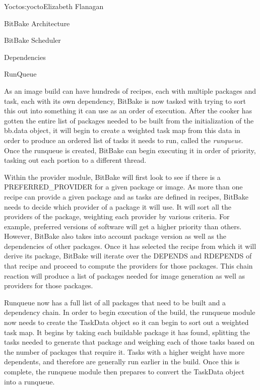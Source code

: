 \begin{aosachapter}{Yocto}{s:yocto}{Elizabeth Flanagan}
\begin{aosasect1}{BitBake Architecture}
\begin{aosasect2}{BitBake Scheduler}
\begin{aosasect3}{Dependencies}
\end{aosasect3}

\begin{aosasect3}{RunQueue}

As an image build can have hundreds of recipes, each with multiple
packages and task, each with its own dependency, BitBake is now
tasked with trying to sort this out into something it can use as an
order of execution. After the cooker has gotten the entire list
of packages needed to be built from the initialization of the bb.data
object, it will begin to create a weighted task map from this data in
order to produce an ordered list of tasks it needs to run, called
the \emph{runqueue}. Once the runqueue is created, BitBake can begin
executing it in order of priority, tasking out each portion to a
different thread.

Within the provider module, BitBake will first look to see if there is
a PREFERRED\_PROVIDER for a given package or image. As more than one
recipe can provide a given package and as tasks are defined in
recipes, BitBake needs to decide which provider of a package it will
use. It will sort all the providers of the package, weighting each
provider by various criteria. For example, preferred versions of
software will get a higher priority than others. However, BitBake also
takes into account package version as well as the dependencies of
other packages. Once it has selected the recipe from which it will
derive its package, BitBake will iterate over the DEPENDS and RDEPENDS
of that recipe and proceed to compute the providers for those
packages. This chain reaction will produce a list of packages needed
for image generation as well as providers for those packages.

Runqueue now has a full list of all packages that need to be built and a
dependency chain. In order to begin execution of the build, the
runqueue module now needs to create the TaskData object so it can
begin to sort out a weighted task map. It begins by taking each
buildable package it has found, splitting the tasks needed to
generate that package and weighing each of those tasks based on the
number of packages that require it. Tasks with a higher weight have
more dependents, and therefore are generally run earlier in the
build. Once this is complete, the runqueue module then prepares to
convert the TaskData object into a runqueue.


\end{aosasect3}
\end{aosasect2}
\end{aosasect1}
\end{aosachapter}
